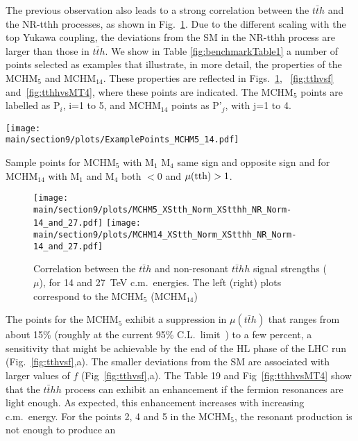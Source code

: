 The previous observation also leads to a strong correlation between the $t\bar{t}h$ and the NR-tthh processes, as shown in Fig.~\ref{fig:nrtthhvstth}. Due to the different scaling with the top Yukawa coupling, the deviations from the SM in the NR-tthh process are larger than those in $t\bar{t}h$.
\label{benchmarks}
We show in Table \ref{fig:benchmarkTable1} 
a number of points selected as examples that illustrate, in
more detail, the properties of the MCHM$_5$ and MCHM$_{14}$.  
These properties are reflected in Figs.~\ref{fig:nrtthhvstth}, ~\ref{fig:tthvsf} and~\ref{fig:tthhvsMT4}, where these points are indicated. The MCHM$_5$ points are labelled as P$_i$, i=1 to 5, and MCHM$_{14}$ points as P'$_j$, with j=1 to 4.
%
\begin{table}[t]
\centering
\texttt{[image: \\main/section9/plots/ExamplePoints\_MCHM5\_14.pdf]}
\caption{Sample points for MCHM$_5$ with M$_1$ M$_4$ same sign and opposite sign and for MCHM$_{14}$ with M$_1$ and M$_4$ both $<0$ and $\mu({\rm tth})>1$.}
\label{fig:benchmarkTable1}
\end{table}
%
\begin{figure}[t]
\centering
\texttt{[image: \\main/section9/plots/MCHM5\_XStth\_Norm\_XStthh\_NR\_Norm-14\_and\_27.pdf]}
\hspace{1cm}
\texttt{[image: \\main/section9/plots/MCHM14\_XStth\_Norm\_XStthh\_NR\_Norm-14\_and\_27.pdf]}
\caption{Correlation between the $t\bar{t}h$ and
non-resonant $t\bar{t}hh$ signal strengths ($\mu$), for 14 and 27~TeV c.m.~energies. The left (right) plots correspond to the MCHM$_5$ (MCHM$_{14}$)}
\label{fig:nrtthhvstth}
\end{figure}
%
The points for the MCHM$_5$ exhibit a suppression in $\mu(t\bar{t}h)$ that ranges from about 15\% (roughly at the current
95\% C.L.~limit~\cite{Aaboud:2018urx, Sirunyan:2018hoz}) to a few
percent, a sensitivity that might be achievable by the end of the HL
phase of the LHC run (Fig.~\ref{fig:tthvsf},a).  The smaller deviations from the SM are
associated with larger values of $f$ (Fig~\ref{fig:tthvsf},a).  The Table 19 and Fig~\ref{fig:tthhvsMT4} show that the
$t\bar{t}hh$ process can exhibit an enhancement if the fermion
resonances are light enough.  As expected, this enhancement increases
with increasing c.m.~energy. For the points 2, 4 and 5 in the MCHM$_{5}$, the resonant production is not enough to produce an

